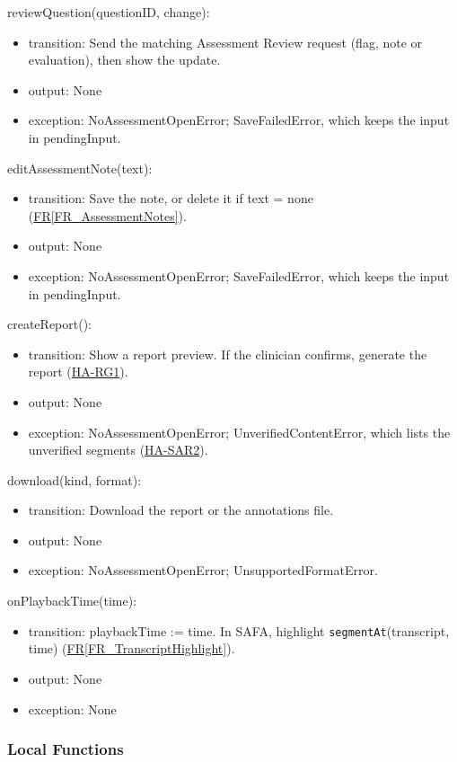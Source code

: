 \documentclass[12pt, titlepage]{article}
\newcommand{\srsref}[2]{\href{https://github.com/Nour-Fawaz/MacaBoca/blob/main/pdfs/SRS/SRS.pdf}{#1\ref*{#2}}}
\newcommand{\hazref}[1]{\href{https://github.com/Nour-Fawaz/MacaBoca/blob/main/pdfs/HazardAnalysis/HazardAnalysis.pdf}{#1}}
\begin{document}
\noindent reviewQuestion(questionID, change):
\begin{itemize}
\item transition: Send the matching Assessment Review request (flag, note or evaluation), then show the update.
\item output: None
\item exception: NoAssessmentOpenError; SaveFailedError, which keeps the input in pendingInput.
\end{itemize}

\noindent editAssessmentNote(text):
\begin{itemize}
\item transition: Save the note, or delete it if text = none (\srsref{FR}{FR_AssessmentNotes}).
\item output: None
\item exception: NoAssessmentOpenError; SaveFailedError, which keeps the input in pendingInput.
\end{itemize}

\noindent createReport():
\begin{itemize}
\item transition: Show a report preview. If the clinician confirms, generate the report (\hazref{HA-RG1}).
\item output: None
\item exception: NoAssessmentOpenError; UnverifiedContentError, which lists the unverified segments (\hazref{HA-SAR2}).
\end{itemize}

\noindent download(kind, format):
\begin{itemize}
\item transition: Download the report or the annotations file.
\item output: None
\item exception: NoAssessmentOpenError; UnsupportedFormatError.
\end{itemize}

\noindent onPlaybackTime(time):
\begin{itemize}
\item transition: playbackTime := time. In SAFA, highlight \texttt{segmentAt}(transcript, time) (\srsref{FR}{FR_TranscriptHighlight}).
\item output: None
\item exception: None
\end{itemize}

\subsubsection{Local Functions}
\end{document}
